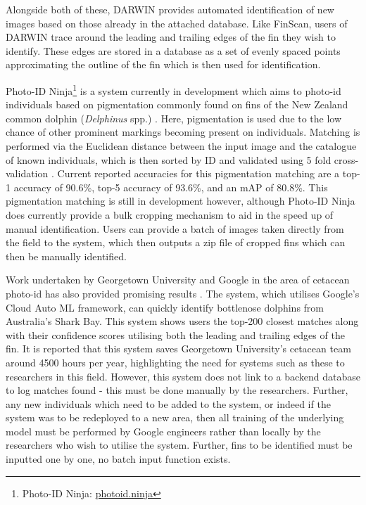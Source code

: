 Alongside both of these, DARWIN \cite{hale_unsupervised_2012} provides automated identification of new images based on those already in the attached database. Like FinScan, users of DARWIN trace around the leading and trailing edges of the fin they wish to identify. These edges are stored in a database as a set of evenly spaced points approximating the outline of the fin which is then used for identification.

Photo-ID Ninja\footnote{Photo-ID Ninja: \href{http://photoid.ninja}{photoid.ninja}} is a system currently in development which aims to photo-id individuals based on pigmentation commonly found on fins of the New Zealand common dolphin (\textit{Delphinus} spp.) \cite{gilman_computer-assisted_2016}. Here, pigmentation is used due to the low chance of other prominent markings becoming present on individuals. Matching is performed via the Euclidean distance between the input image and the catalogue of known individuals, which is then sorted by ID and validated using 5 fold cross-validation \cite{bouma_individual_2018-1}. Current reported accuracies for this pigmentation matching are a top-1 accuracy of 90.6\%, top-5 accuracy of 93.6\%, and an mAP of 80.8\%. This pigmentation matching is still in development however, although Photo-ID Ninja does currently provide a bulk cropping mechanism to aid in the speed up of manual identification. Users can provide a batch of images taken directly from the field to the system, which then outputs a zip file of cropped fins which can then be manually identified. 

Work undertaken by Georgetown University and Google in the area of cetacean photo-id has also provided promising results \cite{mann_mann-urian-google_2019, georgetown_university_is_2018, liang_googles_2018}. The system, which utilises Google's Cloud Auto ML framework, can quickly identify bottlenose dolphins from Australia's Shark Bay. This system shows users the top-200 closest matches along with their confidence scores utilising both the leading and trailing edges of the fin. It is reported that this system saves Georgetown University's cetacean team around 4500 hours per year, highlighting the need for systems such as these to researchers in this field. However, this system does not link to a backend database to log matches found - this must be done manually by the researchers. Further, any new individuals which need to be added to the system, or indeed if the system was to be redeployed to a new area, then all training of the underlying model must be performed by Google engineers rather than locally by the researchers who wish to utilise the system. Further, fins to be identified must be inputted one by one, no batch input function exists.  

